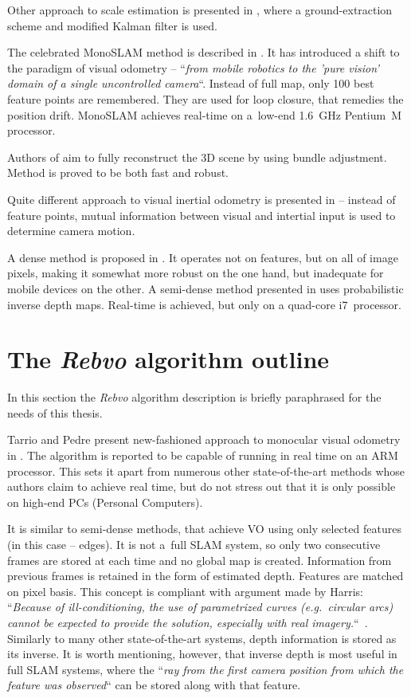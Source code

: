Other approach to scale estimation is presented in \cite{xiao2015novel}, where a ground-extraction scheme and modified Kalman filter is used.

The celebrated MonoSLAM method is described in \cite{monoslam}. It has introduced a shift to the paradigm of visual odometry -- ``\textit{from mobile robotics to the 'pure vision' domain of a single uncontrolled camera}``. Instead of full map, only 100 best feature points are remembered. They are used for loop closure, that remedies the position drift. MonoSLAM achieves real-time on a~low-end 1.6~GHz Pentium~M processor.


Authors of \cite{mouragnon2006real} aim to fully reconstruct the 3D scene by using bundle adjustment. Method is proved to be both fast and robust.

Quite different approach to visual inertial odometry is presented in \cite{gui2015robust} -- instead of feature points, mutual information between visual and intertial input is used to determine camera motion.

A dense method is proposed in \cite{robust_visual_odometry_estimation}. It operates not on features, but on all of image pixels, making it somewhat more robust on the one hand, but inadequate for mobile devices on the other. A semi-dense method presented in \cite{semi_dense} uses probabilistic inverse depth maps. Real-time is achieved, but only on a quad-core i7~processor.



\section{The \textit{Rebvo} algorithm outline}
\label{sec:rebvo_outline}

In this section the \textit{Rebvo} algorithm description is briefly paraphrased for the needs of this thesis.

Tarrio and Pedre present new-fashioned approach to monocular visual odometry in \cite{jose2015realtime}. The algorithm is reported to be capable of running in real time on an ARM processor. This sets it apart from numerous other state-of-the-art methods whose authors claim to achieve real time, but do not stress out that it is only possible on high-end PCs (Personal Computers).

It is similar to semi-dense methods, that achieve VO using only selected features (in this case -- edges). It is not a~full SLAM system, so only two consecutive frames are stored at each time and no global map is created. Information from previous frames is retained in the form of estimated depth. Features are matched on pixel basis. This concept is compliant with argument made by Harris: ``\textit{Because of ill-conditioning, the use of parametrized curves (e.g.~circular arcs) cannot be expected to provide the solution, especially with real imagery.}``~\cite{harris}. Similarly to many other state-of-the-art systems, depth information is stored as its inverse. It is worth mentioning, however, that inverse depth is most useful in full SLAM systems, where the ``\textit{ray from the first camera position from which the feature was observed}`` \cite{civera2008inverse} can be stored along with that feature.



